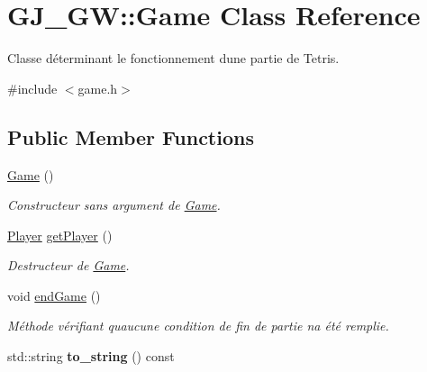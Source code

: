 \hypertarget{class_g_j___g_w_1_1_game}{}\section{G\+J\+\_\+\+GW\+:\+:Game Class Reference}
\label{class_g_j___g_w_1_1_game}


Classe déterminant le fonctionnement d\textquotesingle{}une partie de Tetris.  




{\ttfamily \#include $<$game.\+h$>$}

\subsection*{Public Member Functions}
\begin{DoxyCompactItemize}
\item 
\hyperlink{class_g_j___g_w_1_1_game_acabf662fb6929976e25cf29006f665c0}{Game} ()\hypertarget{class_g_j___g_w_1_1_game_acabf662fb6929976e25cf29006f665c0}{}\label{class_g_j___g_w_1_1_game_acabf662fb6929976e25cf29006f665c0}

\begin{DoxyCompactList}\small\item\em Constructeur sans argument de \hyperlink{class_g_j___g_w_1_1_game}{Game}. \end{DoxyCompactList}\item 
\hyperlink{class_g_j___g_w_1_1_player}{Player} \hyperlink{class_g_j___g_w_1_1_game_addf52c888f8deed2651bda020ecde811}{get\+Player} ()
\begin{DoxyCompactList}\small\item\em Destructeur de \hyperlink{class_g_j___g_w_1_1_game}{Game}. \end{DoxyCompactList}\item 
void \hyperlink{class_g_j___g_w_1_1_game_ad09c3f7d5281b6bbc1a7166cb8077af1}{end\+Game} ()
\begin{DoxyCompactList}\small\item\em Méthode vérifiant qu\textquotesingle{}aucune condition de fin de partie n\textquotesingle{}a été remplie. \end{DoxyCompactList}\item 
std\+::string {\bfseries to\+\_\+string} () const \hypertarget{class_g_j___g_w_1_1_game_acc7dd63cbb397c850dd754e7a224c1e2}{}\label{class_g_j___g_w_1_1_game_acc7dd63cbb397c850dd754e7a224c1e2}

\end{DoxyCompactItemize}

